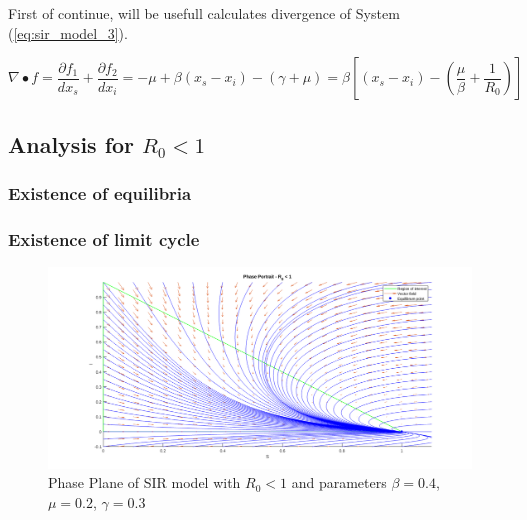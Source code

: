First of continue, will be usefull calculates divergence of System (\ref{eq:sir_model_3}).

\begin{equation}
\label{eq:divergence}
    \nabla\bullet f = \frac{\partial f_1}{dx_s} + \frac{\partial f_2}{dx_i}=-\mu+\beta (x_s - x_i) -(\gamma + \mu)=\beta\left[(x_s - x_i) - \left(\frac{\mu}{\beta} + \frac{1}{R_0}\right)\right]
\end{equation}

\subsection{Analysis for $R_0 < 1$}
\subsubsection{Existence of equilibria}

\subsubsection{Existence of limit cycle}


\begin{figure}[h!]
    \centering
    \includegraphics[scale=0.45]{Figure/pp_R0_minor_1.png}
    \caption{Phase Plane of SIR model with $R_0 < 1$ and parameters $\beta = 0.4$, $\mu = 0.2$, $\gamma=0.3$}
    \label{fig:phase_plane_r0_minor_1}
\end{figure}

